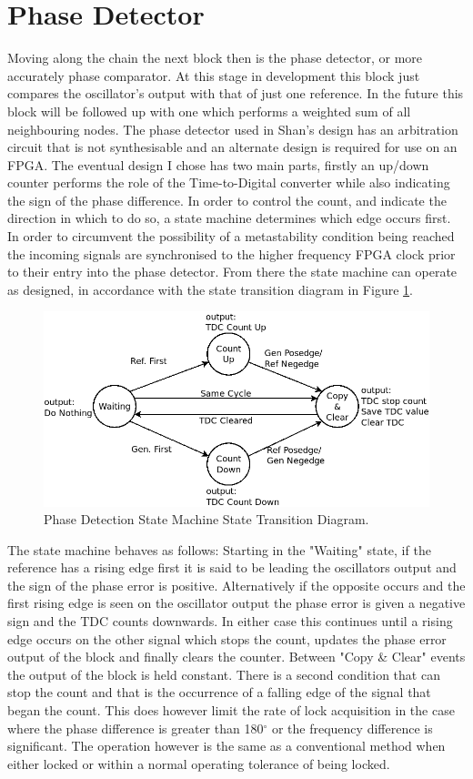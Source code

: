\documentclass[11pt,english,british]{report}
\begin{document}
\section{Phase Detector}
Moving along the chain the next block then is the phase detector, or more accurately phase comparator. At this stage in development this block just compares the oscillator's output with that of just one reference. In the future this block will be followed up with one which performs a weighted sum of all neighbouring nodes. The phase detector used in Shan's design has an arbitration circuit that is not synthesisable and an alternate design is required for use on an FPGA. The eventual design I chose has two main parts, firstly an up/down counter performs the role of the Time-to-Digital converter while also indicating the sign of the phase difference. In order to control the count, and indicate the direction in which to do so, a state machine determines which edge occurs first. In order to circumvent the possibility of a metastability condition being reached the incoming signals are synchronised to the higher frequency FPGA clock prior to their entry into the phase detector. From there the state machine can operate as designed, in accordance with the state transition diagram in Figure \ref{fig:my_state_machine}.
\begin{figure}[h]
	\centering
	\includegraphics[scale=0.35]{../state_trans_diagram}
	\caption{Phase Detection State Machine State Transition Diagram.}
	\label{fig:my_state_machine}
\end{figure}
The state machine behaves as follows: Starting in the "Waiting" state, if the reference has a rising edge first it is said to be leading the oscillators output and the sign of the phase error is positive. Alternatively if the opposite occurs and the first rising edge is seen on the oscillator output the phase error is given a negative sign and the TDC counts downwards. In either case this continues until a rising edge occurs on the other signal which stops the count, updates the phase error output of the block and finally clears the counter. Between "Copy \& Clear" events the output of the block is held constant. There is a second condition that can stop the count and that is the occurrence of a falling edge of the signal that began the count. This does however limit the rate of lock acquisition in the case where the phase difference is greater than 180$^\circ$ or the frequency difference is significant. The operation however is the same as a conventional method when either locked or within a normal operating tolerance of being locked.\\
\end{document}
